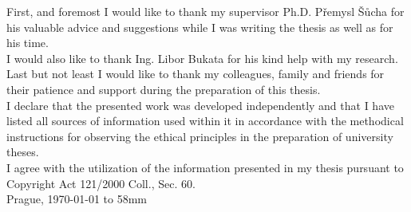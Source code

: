 \documentclass[11pt,twoside,a4paper,dvipsnames,svgnames]{book}
\author{Jan Dryk}
\begin{document}

\cleardoublepage

\maketitle
\cleardoublepage

{%
	First, and foremost I would like to thank my supervisor Ph.D. Přemysl Šůcha for his
    valuable advice and suggestions while I was writing the thesis as well as for his time.\\
    
    I would also like to thank Ing. Libor Bukata for his kind help with my research.\\
    
    Last but not least I would like to thank my colleagues, family and friends for their patience
    and support during the preparation of this thesis. \\
}
{%
    I declare that the presented work was developed independently and that I have listed
    all sources of information used within it in accordance with the methodical instructions for
    observing the ethical principles in the preparation of university theses. \\
    
    I agree with the utilization of the information presented in my thesis pursuant to
    Copyright Act 121/2000 Coll., Sec. 60. 
\\[90mm]
	Prague, \today \vspace{10mm} \hfill \hbox to 58mm{\tiny\dotfill}
}

\cleardoublepage


{
    
}
{
    
}

\setcounter{page}{1}

\tableofcontents











\printbibliography
\appendix





\end{document}
